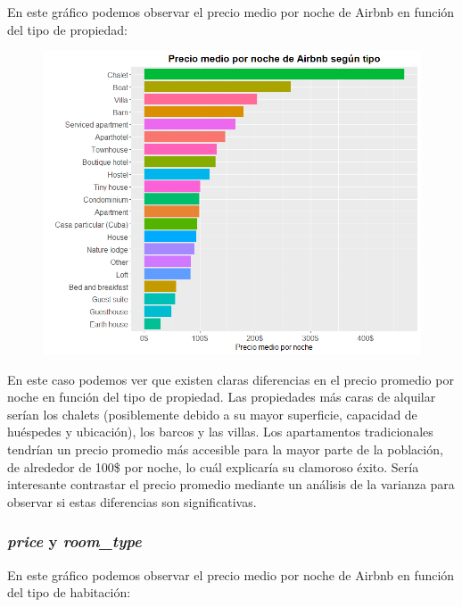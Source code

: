\documentclass{article}
\begin{document}
En este gráfico podemos observar el precio medio por noche de Airbnb en función del tipo de propiedad:

\vspace{0.35cm}
\begin{figure}[h]
\hspace*{-0.15cm}
\centering
\includegraphics[scale = 0.6]{precio_tipo_propiedad}
\end{figure}
\vspace{0.15cm}

En este caso podemos ver que existen claras diferencias en el precio promedio por noche en función del tipo de propiedad. Las propiedades más caras de alquilar serían los chalets (posiblemente debido a su mayor superficie, capacidad de huéspedes y ubicación), los barcos y las villas. Los apartamentos tradicionales tendrían un precio promedio más accesible para la mayor parte de la población, de alrededor de 100\$ por noche, lo cuál explicaría su clamoroso éxito. Sería interesante contrastar el precio promedio mediante un análisis de la varianza para observar si estas diferencias son significativas. 

\clearpage
\subsubsection{\emph{price} y \emph{room\_type}}

En este gráfico podemos observar el precio medio por noche de Airbnb en función del tipo de habitación:
\end{document}
